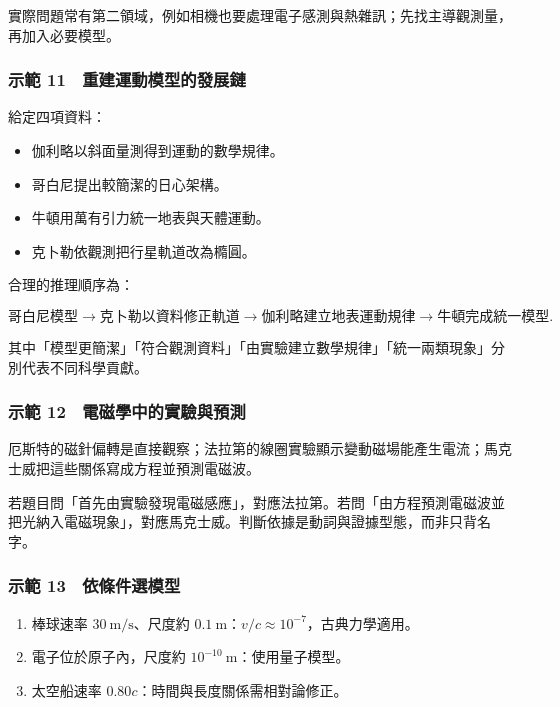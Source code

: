 \documentclass[11pt,a4paper]{article}
\providecommand{\tightlist}{%
  \setlength{\itemsep}{0pt}\setlength{\parskip}{0pt}}
\begin{document}
實際問題常有第二領域，例如相機也要處理電子感測與熱雜訊；先找主導觀測量，再加入必要模型。

\subsubsection{示範 11　重建運動模型的發展鏈}\label{ux793aux7bc4-11-ux91cdux5efaux904bux52d5ux6a21ux578bux7684ux767cux5c55ux93c8}

給定四項資料：

\begin{itemize}
\tightlist
\item
  伽利略以斜面量測得到運動的數學規律。
\item
  哥白尼提出較簡潔的日心架構。
\item
  牛頓用萬有引力統一地表與天體運動。
\item
  克卜勒依觀測把行星軌道改為橢圓。
\end{itemize}

合理的推理順序為：

\[
\text{哥白尼模型}
\rightarrow
\text{克卜勒以資料修正軌道}
\rightarrow
\text{伽利略建立地表運動規律}
\rightarrow
\text{牛頓完成統一模型}.
\]

其中「模型更簡潔」「符合觀測資料」「由實驗建立數學規律」「統一兩類現象」分別代表不同科學貢獻。

\subsubsection{示範 12　電磁學中的實驗與預測}\label{ux793aux7bc4-12-ux96fbux78c1ux5b78ux4e2dux7684ux5be6ux9a57ux8207ux9810ux6e2c}

厄斯特的磁針偏轉是直接觀察；法拉第的線圈實驗顯示變動磁場能產生電流；馬克士威把這些關係寫成方程並預測電磁波。

若題目問「首先由實驗發現電磁感應」，對應法拉第。若問「由方程預測電磁波並把光納入電磁現象」，對應馬克士威。判斷依據是動詞與證據型態，而非只背名字。

\subsubsection{示範 13　依條件選模型}\label{ux793aux7bc4-13-ux4f9dux689dux4ef6ux9078ux6a21ux578b}

\begin{enumerate}
\def\labelenumi{\arabic{enumi}.}
\tightlist
\item
  棒球速率 \(30\ \mathrm{m/s}\)、尺度約 \(0.1\ \mathrm m\)：\(v/c\approx10^{-7}\)，古典力學適用。
\item
  電子位於原子內，尺度約 \(10^{-10}\ \mathrm m\)：使用量子模型。
\item
  太空船速率 \(0.80c\)：時間與長度關係需相對論修正。
\end{enumerate}
\end{document}
